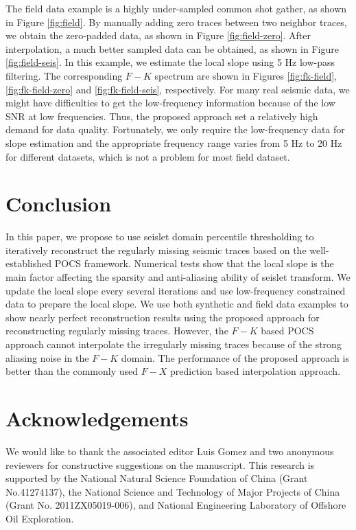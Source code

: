 The field data example is a highly under-sampled common shot gather, as shown in Figure \ref{fig:field}. By manually adding zero traces between two neighbor traces, we obtain the zero-padded data, as shown in Figure \ref{fig:field-zero}. After interpolation, a much better sampled data can be obtained, as shown in Figure \ref{fig:field-seis}. In this example, we estimate the local slope using 5 Hz low-pass filtering. The corresponding $F-K$ spectrum are shown in Figures \ref{fig:fk-field}, \ref{fig:fk-field-zero} and \ref{fig:fk-field-seis}, respectively. For many real seismic data, we might have difficulties to get the low-frequency information because of the low SNR at low frequencies. Thus, the proposed approach set a relatively high demand for data quality. Fortunately, we only require the low-frequency data for slope estimation and the appropriate frequency range varies from 5 Hz to 20 Hz for different datasets, which is not a problem for most field dataset.





\section{Conclusion}
In this paper, we propose to use seislet domain percentile thresholding to iteratively reconstruct the regularly missing seismic traces based on the well-established POCS framework. Numerical tests show that the local slope is the main factor affecting the sparsity and anti-aliasing ability of seislet transform. %
We update the local slope every several iterations and use low-frequency constrained data to prepare the local slope. We use both synthetic and field data examples to show nearly perfect reconstruction results using the proposed approach for reconstructing regularly missing traces. However, the $F-K$ based POCS approach cannot interpolate the irregularly missing traces because of the strong aliasing noise in the $F-K$ domain. The performance of the proposed approach is better than the commonly used $F-X$ prediction based interpolation approach. 
 
\section{Acknowledgements}
We would like to thank the associated editor Luis Gomez and two anonymous reviewers for constructive suggestions on the manuscript. This research is supported by the National Natural Science Foundation of China (Grant No.41274137), the National Science and Technology of Major Projects of China (Grant No. 2011ZX05019-006), and National Engineering Laboratory of Offshore Oil Exploration.



